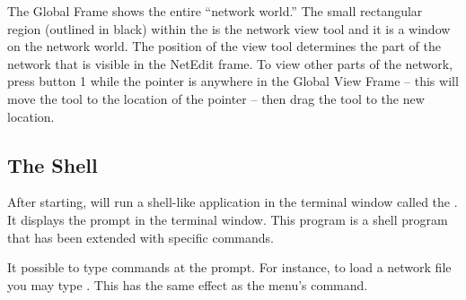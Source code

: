 The Global Frame shows the entire ``network world.''  The small
rectangular region (outlined in black) within the  is the
network view tool and it is a window on the network world.  The
position of the view tool determines the part of the network that is
visible in the NetEdit frame.  To view other parts of the network, press
button 1 while the pointer is anywhere in the Global View Frame -- this will
move the tool to the location of the pointer --  then drag the tool to the
new location.


\subsection{The \sr{} Shell}
\label{sec:termapp}

After starting, \sr{} will run a shell-like application in the terminal
window called the .  It displays the prompt
 in the terminal window.  This program is a
 shell program that has been extended with
\sr{} specific commands.

It possible to type \tcl{} \sr{} commands at the prompt.  For
instance, to load a network file you may type .  This has the same effect as the 
menu's  command.



